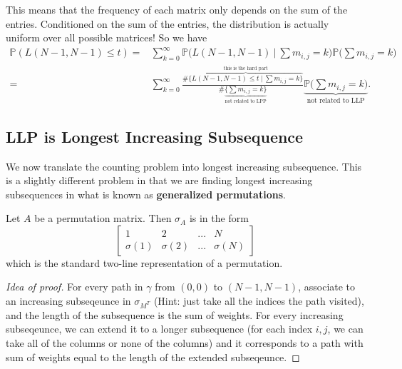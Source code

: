 This means that the frequency of each matrix only depends on the sum of the entries. Conditioned on the sum of the entries, the distribution is actually uniform over all possible matrices! So we have \begin{align*}
    \mathbb{P}(L(N-1,N-1)\leq t) =& \sum_{k=0}^{\infty} \mathbb{P}\Big(L(N-1,N-1) \ |\ \sum m_{i,j}=k\Big)\mathbb{P}\Big(\sum m_{i,j}=k\Big)\\
    =& \sum_{k=0}^{\infty} \frac{\#\overbrace{ \{L(N-1,N-1)\leq t \ |\ \sum m_{i,j}=k\}}^{\text{this is the hard part}}}{\#\underbrace{\{ \sum m_{i,j}=k\}}_{\text{not related to LPP}}} \underbrace{\mathbb{P}\Big(\sum m_{i,j}=k\Big)}_{\text{not related to LLP}}.
\end{align*}

\subsection*{LLP is Longest Increasing Subsequence}
We now translate the counting problem into longest increasing subsequence. This is a slightly different problem in that we are finding longest increasing subsequences in what is known as \textbf{generalized permutations}. 
\begin{aexample}{}{}
    Let $A$ be a permutation matrix. Then $\sigma_A$ is in the form \[
    \begin{bmatrix}
        1 & 2 &... & N\\
        \sigma(1) & \sigma(2) & ... &\sigma(N)
    \end{bmatrix}
    \]
    which is the standard two-line representation of a permutation.
\end{aexample}

\begin{proof}[Idea of proof]
    For every path in $\gamma$ from $(0,0)$ to $(N-1,N-1)$, associate to an increasing subseqeunce in $\sigma_{M^T}$ (Hint: just take all the indices the path visited), and the length of the subsequence is the sum of weights. For every increasing subseqeunce, we can extend it to a longer subsequence (for each index $i,j$, we can take all of the columns or none of the columns) and it corresponds to a path with sum of weights equal to the length of the extended subseqeunce.
\end{proof}